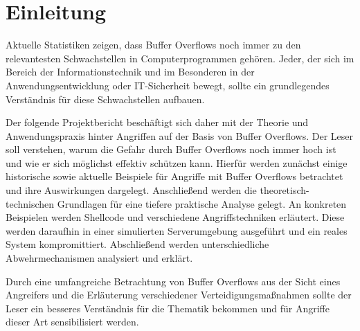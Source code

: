 \section{Einleitung}
Aktuelle Statistiken zeigen, dass Buffer Overflows noch immer zu den relevantesten Schwachstellen in Computerprogrammen gehören.
Jeder, der sich im Bereich der Informationstechnik und im Besonderen in der Anwendungsentwicklung oder IT-Sicherheit bewegt,
sollte ein grundlegendes Verständnis für diese Schwachstellen aufbauen.

Der folgende Projektbericht beschäftigt sich daher mit der Theorie und Anwendungspraxis hinter Angriffen auf der Basis von Buffer Overflows.
Der Leser soll verstehen, warum die Gefahr durch Buffer Overflows noch immer hoch ist und wie er sich möglichst effektiv schützen kann.
Hierfür werden zunächst einige historische sowie aktuelle Beispiele für Angriffe mit Buffer Overflows betrachtet und ihre Auswirkungen dargelegt.
Anschließend werden die theoretisch-technischen Grundlagen für eine tiefere praktische Analyse gelegt. 
An konkreten Beispielen werden Shellcode und verschiedene Angriffstechniken erläutert. 
Diese werden daraufhin in einer simulierten Serverumgebung ausgeführt und ein reales System kompromittiert. 
Abschließend werden unterschiedliche Abwehrmechanismen analysiert und erklärt.

Durch eine umfangreiche Betrachtung von Buffer Overflows aus der Sicht eines Angreifers und die Erläuterung verschiedener Verteidigungsmaßnahmen 
sollte der Leser ein besseres Verständnis für die Thematik bekommen und für Angriffe dieser Art sensibilisiert werden. \cite{owasptop}

